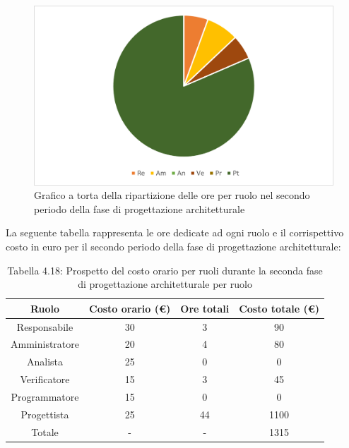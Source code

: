 \begin{figure}[H]
    \centering
    \includegraphics[scale=0.6]{img/grafi preventivo/torta/architetturale/periodo2.png}
    \caption{Grafico a torta della ripartizione delle ore per ruolo nel secondo periodo della fase di progettazione architetturale}
\end{figure}
La seguente tabella rappresenta le ore dedicate ad ogni ruolo e il corrispettivo costo in euro per il secondo periodo della fase di progettazione architetturale:
\begin{table}[h]
	\setlength\extrarowheight{5pt}
	\centering
	\begin{tabularx}{\textwidth}{|ccc|c|}
		\hline
		\rowcolor{white}
		\textbf{Ruolo} & \textbf{Costo orario (€)} & \textbf{Ore totali} & \textbf{Costo totale (€)} \\
		\hline
		Responsabile &30&3&90 \\
		Amministratore &20&4&80 \\
		Analista &25&0&0 \\
		Verificatore &15&3&45 \\
		Programmatore &15&0&0 \\
		Progettista &25&44&1100 \\
		\hline
		Totale &-&-&1315 \\
		\hline
	\end{tabularx}
    \vspace{10pt}
	\caption{Tabella 4.18: Prospetto del costo orario per ruoli durante la seconda fase di progettazione architetturale per ruolo}
\end{table}
\newpage
